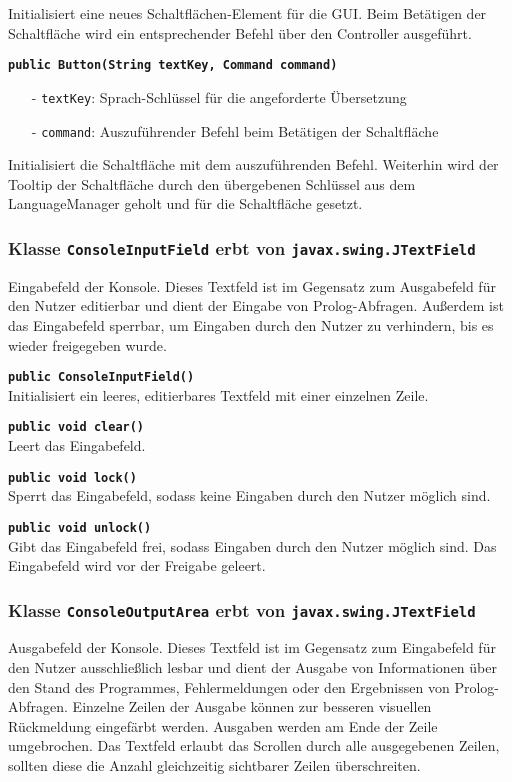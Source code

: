 \documentclass[parskip=full,11pt,twoside]{scrartcl}
\begin{document}
Initialisiert eine neues Schaltflächen-Element für die GUI. Beim Betätigen der Schaltfläche wird ein entsprechender Befehl über den Controller ausgeführt.

\textbf{\texttt{public Button(String textKey, Command command)}}
\begin{itemize}[noitemsep]
	\item[-] \texttt{textKey}: Sprach-Schlüssel für die angeforderte Übersetzung
	\item[-] \texttt{command}: Auszuführender Befehl beim Betätigen der Schaltfläche
\end{itemize}
Initialisiert die Schaltfläche mit dem auszuführenden Befehl. Weiterhin wird der Tooltip der Schaltfläche durch den übergebenen Schlüssel aus dem LanguageManager geholt und für die Schaltfläche gesetzt.

\subsubsection{Klasse \texttt{ConsoleInputField} erbt von \texttt{javax.swing.JTextField}}

Eingabefeld der Konsole. Dieses Textfeld ist im Gegensatz zum Ausgabefeld für den Nutzer editierbar und dient der Eingabe von Prolog-Abfragen. Außerdem ist das Eingabefeld sperrbar, um Eingaben durch den Nutzer zu verhindern, bis es wieder freigegeben wurde.

\textbf{\texttt{public ConsoleInputField()}}\\
Initialisiert ein leeres, editierbares Textfeld mit einer einzelnen Zeile.

\textbf{\texttt{public void clear()}}\\
Leert das Eingabefeld.

\textbf{\texttt{public void lock()}}\\
Sperrt das Eingabefeld, sodass keine Eingaben durch den Nutzer möglich sind.

\textbf{\texttt{public void unlock()}}\\
Gibt das Eingabefeld frei, sodass Eingaben durch den Nutzer möglich sind. Das Eingabefeld wird vor der Freigabe geleert.

\subsubsection{Klasse \texttt{ConsoleOutputArea} erbt von \texttt{javax.swing.JTextField}}

Ausgabefeld der Konsole. Dieses Textfeld ist im Gegensatz zum Eingabefeld für den Nutzer ausschließlich lesbar und dient der Ausgabe von Informationen über den Stand des Programmes, Fehlermeldungen oder den Ergebnissen von Prolog-Abfragen. Einzelne Zeilen der Ausgabe können zur besseren visuellen Rückmeldung eingefärbt werden. Ausgaben werden am Ende der Zeile umgebrochen. Das Textfeld erlaubt das Scrollen durch alle ausgegebenen Zeilen, sollten diese die Anzahl gleichzeitig sichtbarer Zeilen überschreiten.
\end{document}
